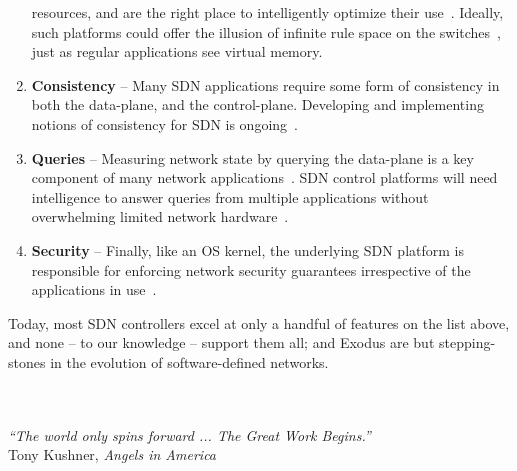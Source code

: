 \begin{enumerate}
resources, and are the right place to intelligently optimize their use~\cite{Curtis:2011,Yu:2010,Kang:2013optimizing,Kanizo:2013palette}. Ideally, such platforms
could offer the illusion of infinite rule space on the switches~\cite{cacheflow}, just as regular applications see
virtual memory.
\item {\bf Consistency} -- Many SDN applications require some form of consistency in both the
data-plane, and the control-plane. Developing and implementing notions of consistency for
SDN is ongoing~\cite{reitblatt12consistent,Mahajan2013,of.cpp,sdn-transactions}.
\item {\bf Queries} -- Measuring network state by querying the data-plane is a key component of
many network applications~\cite{alfares10hedera,jain++:sigcomm13-google-sdn,elastictree,Benson2011microte}. SDN control platforms will need intelligence to answer
queries from multiple applications without overwhelming limited network hardware~\cite{Rotsos:2012oflops}.
\item{\bf Security} -- Finally, like an OS kernel, the underlying SDN platform is responsible for enforcing
network security guarantees irrespective of the applications in use~\cite{FRESCO,FortNox}.
\end{enumerate}

Today, most SDN controllers excel at only a handful of features on the list above, and none -- to our knowledge --
support them all; \sys and Exodus are but stepping-stones in the evolution of software-defined networks.

\ \\
\ \\
{\raggedleft{}
\emph{``The world only spins forward ... The Great Work Begins.''}\\
\hfill Tony Kushner, \emph{Angels in America}
}



